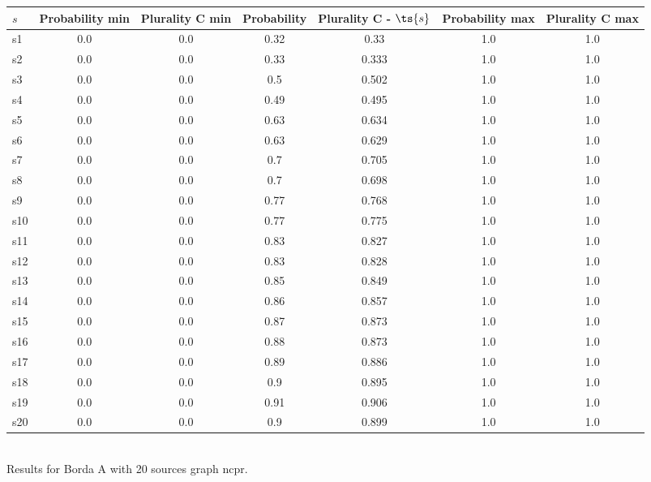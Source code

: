 \documentclass{article}
\begin{document}
\noindent\begin{tabular}{|l|c|c|c|c|c|c|}
\hline
$s$& Probability min & Plurality C min & Probability & Plurality C - $\ts{s}$ & Probability max & Plurality C max\\
\hline
s1 &0.0 & 0.0 & 0.32 & 0.33 & 1.0 & 1.0\\
\hline
s2 &0.0 & 0.0 & 0.33 & 0.333 & 1.0 & 1.0\\
\hline
s3 &0.0 & 0.0 & 0.5 & 0.502 & 1.0 & 1.0\\
\hline
s4 &0.0 & 0.0 & 0.49 & 0.495 & 1.0 & 1.0\\
\hline
s5 &0.0 & 0.0 & 0.63 & 0.634 & 1.0 & 1.0\\
\hline
s6 &0.0 & 0.0 & 0.63 & 0.629 & 1.0 & 1.0\\
\hline
s7 &0.0 & 0.0 & 0.7 & 0.705 & 1.0 & 1.0\\
\hline
s8 &0.0 & 0.0 & 0.7 & 0.698 & 1.0 & 1.0\\
\hline
s9 &0.0 & 0.0 & 0.77 & 0.768 & 1.0 & 1.0\\
\hline
s10 &0.0 & 0.0 & 0.77 & 0.775 & 1.0 & 1.0\\
\hline
s11 &0.0 & 0.0 & 0.83 & 0.827 & 1.0 & 1.0\\
\hline
s12 &0.0 & 0.0 & 0.83 & 0.828 & 1.0 & 1.0\\
\hline
s13 &0.0 & 0.0 & 0.85 & 0.849 & 1.0 & 1.0\\
\hline
s14 &0.0 & 0.0 & 0.86 & 0.857 & 1.0 & 1.0\\
\hline
s15 &0.0 & 0.0 & 0.87 & 0.873 & 1.0 & 1.0\\
\hline
s16 &0.0 & 0.0 & 0.88 & 0.873 & 1.0 & 1.0\\
\hline
s17 &0.0 & 0.0 & 0.89 & 0.886 & 1.0 & 1.0\\
\hline
s18 &0.0 & 0.0 & 0.9 & 0.895 & 1.0 & 1.0\\
\hline
s19 &0.0 & 0.0 & 0.91 & 0.906 & 1.0 & 1.0\\
\hline
s20 &0.0 & 0.0 & 0.9 & 0.899 & 1.0 & 1.0\\
\hline
\end{tabular}\\

\noindent Results for Borda A with 20 sources graph ncpr.
\end{document}
